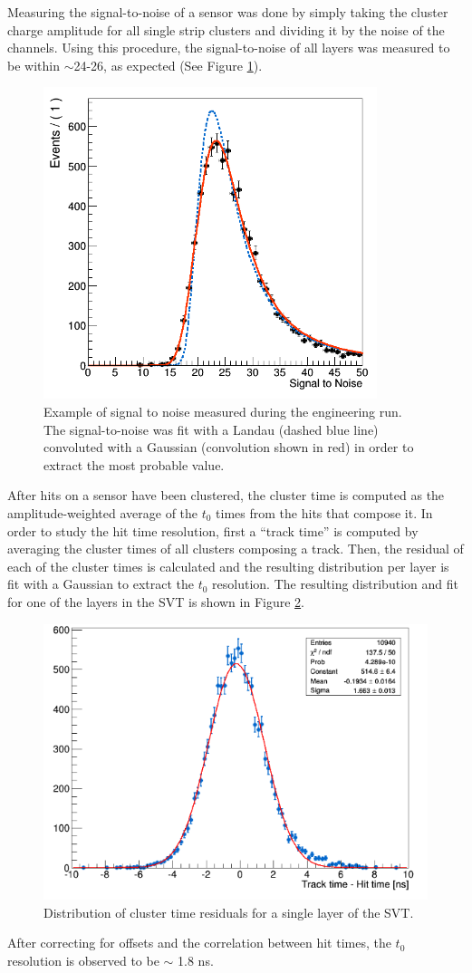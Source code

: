 Measuring the signal-to-noise of a sensor was done by simply taking the 
cluster charge amplitude for all single strip clusters and dividing it by
the noise of the channels.  Using this procedure, 
the signal-to-noise of all layers was measured to be within $\sim$24-26, 
as expected (See Figure \ref{fig:sig_noise}).
\begin{figure}[h!t]
    \centering
    \includegraphics[width=.7\textwidth]{images/sig_noise.png}
    \caption{Example of signal to noise measured during the engineering run.
             The signal-to-noise was fit with a Landau (dashed blue line) 
             convoluted with a Gaussian (convolution shown in red)
             in order to extract the most probable 
             value.}
    \label{fig:sig_noise}
\end{figure}  

After hits on a sensor have been
clustered, the cluster time is computed as the amplitude-weighted average
of the $t_0$ times from the hits that compose it.  In order to study the hit
time resolution, first a ``track time'' is computed by averaging the cluster 
times of all clusters composing a track.  Then, the residual of each of the 
cluster times is
calculated and the resulting distribution per layer is fit with a Gaussian
to extract the $t_0$ resolution.  The resulting distribution and fit for 
one of the layers in the SVT is shown in Figure \ref{fig:t0_res}.  
\begin{figure}[h!b]
    \centering
    \includegraphics[width=.7\textwidth]{images/t0_res.png}
    \caption{Distribution of cluster time residuals for a single layer of
    the SVT.}
    \label{fig:t0_res}
\end{figure} 
After correcting for offsets and the correlation between hit times, 
the $t_{0}$ resolution is observed to be $\sim$ 
1.8 ns.

